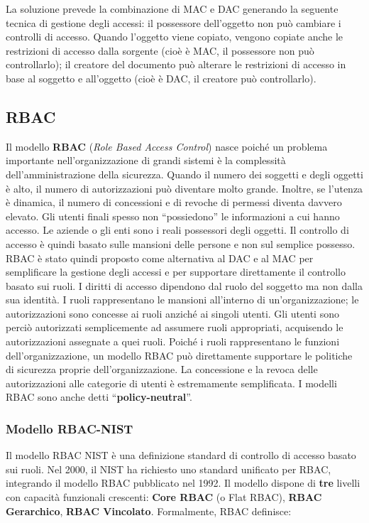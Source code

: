 La soluzione prevede la combinazione di MAC e DAC generando la seguente tecnica
di gestione degli accessi: il possessore dell'oggetto non può cambiare i
controlli di accesso. Quando l'oggetto
viene copiato, vengono copiate anche le restrizioni di accesso dalla sorgente
(cioè è MAC, il possessore non può controllarlo); il creatore del documento può
alterare le restrizioni di accesso in base al soggetto e all'oggetto
(cioè è DAC, il creatore può controllarlo).

\subsection{RBAC}

Il modello \textbf{RBAC} (\textit{Role Based Access Control}) nasce poiché un
problema importante nell'organizzazione di grandi sistemi è la complessità
dell'amministrazione della sicurezza.
Quando il numero dei soggetti e degli oggetti è alto, il numero di autorizzazioni
può diventare molto grande.
Inoltre, se l'utenza è dinamica, il numero di concessioni e di revoche di permessi
diventa davvero elevato. Gli utenti finali spesso non ``possiedono'' le informazioni
a cui hanno accesso. Le aziende o gli enti sono i reali possessori degli oggetti.
Il controllo di accesso è quindi basato sulle mansioni delle persone e non sul
semplice possesso.
RBAC è stato quindi proposto come alternativa al DAC e al MAC per semplificare
la gestione degli accessi e per supportare direttamente il controllo basato sui
ruoli.
I diritti di accesso dipendono dal ruolo del soggetto ma non dalla sua identità.
I ruoli rappresentano le mansioni all'interno di un'organizzazione;
le autorizzazioni sono concesse ai ruoli anziché ai
singoli utenti. Gli utenti sono perciò autorizzati semplicemente ad assumere ruoli
appropriati, acquisendo le autorizzazioni assegnate a quei ruoli.
Poiché i ruoli rappresentano le funzioni dell'organizzazione, un modello RBAC può
direttamente supportare le politiche di sicurezza proprie dell'organizzazione.
La concessione e la revoca delle
autorizzazioni alle categorie di utenti è estremamente semplificata.
I modelli RBAC sono anche detti ``\textbf{policy-neutral}''.

\subsubsection{Modello RBAC-NIST}

Il modello RBAC NIST è una definizione standard di controllo di accesso basato
sui ruoli. Nel 2000, il NIST ha richiesto uno standard unificato per RBAC,
integrando il modello RBAC pubblicato nel 1992.
Il modello dispone di \textbf{tre} livelli con capacità funzionali crescenti:
\textbf{Core RBAC} (o Flat RBAC), \textbf{RBAC Gerarchico}, \textbf{RBAC Vincolato}.
Formalmente, RBAC definisce:

